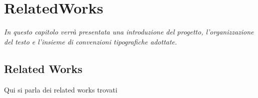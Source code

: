 \chapter{RelatedWorks}
\label{cap:RelatedWorks}

\textit{\indent In questo capitolo verrà presentata una introduzione del progetto, l'organizzazione del testo e l'insieme di convenzioni tipografiche adottate.
}
\section{Related Works}

Qui si parla dei related works trovati


